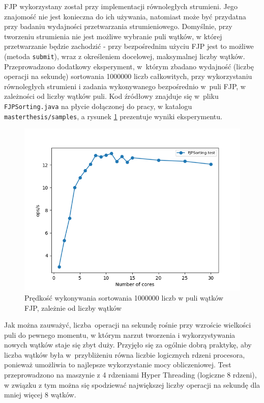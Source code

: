 \documentclass[12pt,twoside,openright]{extarticle}
\begin{document}
    FJP wykorzystany został przy implementacji równoległych strumieni. Jego znajomość nie jest konieczna do ich używania, natomiast może być przydatna przy badaniu wydajności przetwarzania strumieniowego. Domyślnie, przy tworzeniu strumienia nie jest możliwe wybranie puli wątków, w której przetwarzanie będzie zachodzić - przy bezpośrednim użyciu FJP jest to możliwe (metoda \texttt{submit}), wraz z określeniem docelowej, maksymalnej liczby wątków. Przeprowadzono dodatkowy eksperyment, w~którym zbadano wydajność (liczbę operacji na sekundę) sortowania 1000000 liczb całkowitych, przy wykorzystaniu równoległych strumieni i zadania wykonywanego bezpośrednio w~puli FJP, w zależności od liczby wątków puli. Kod źródłowy znajduje się w~pliku \texttt{FJPSorting.java} na płycie dołączonej do pracy, w katalogu \texttt{masterthesis/samples}, a rysunek \ref{fig:fjpsorting} prezentuje wyniki eksperymentu.

\begin{figure}[H]
\centering
\includegraphics[width=13cm]{plots/FJPSorting}
\caption{Prędkość wykonywania sortowania 1000000 liczb w puli wątków FJP, zależnie od liczby wątków}
\label{fig:fjpsorting}
\end{figure}

    Jak można zauważyć, liczba operacji na sekundę rośnie przy wzroście wielkości puli do pewnego momentu, w którym narzut tworzenia i wykorzystywania nowych wątków staje się zbyt duży. Przyjęło się za ogólnie dobrą praktykę, aby liczba wątków była w~przybliżeniu równa liczbie logicznych rdzeni procesora, ponieważ umożliwia to najlepsze wykorzystanie mocy obliczeniowej. Test przeprowadzono na maszynie z 4 rdzeniami Hyper Threading (logiczne 8 rdzeni), w związku z tym można się spodziewać największej liczby operacji na sekundę dla mniej więcej 8 wątków.
\end{document}

